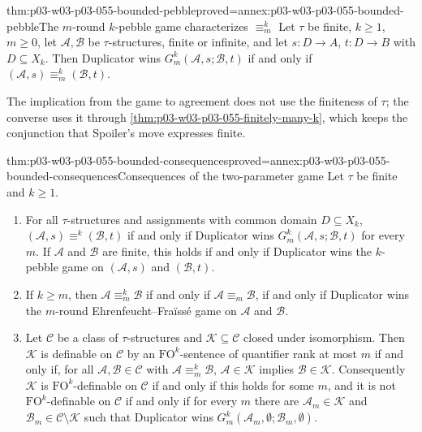 \begin{hbtheorem}{thm:p03-w03-p03-055-bounded-pebble}{proved=annex:p03-w03-p03-055-bounded-pebble}{The \(m\)-round \(k\)-pebble game characterizes \(\equiv^k_m\)}
Let \(\tau\) be finite, \(k\ge1\), \(m\ge0\), let \(\mathcal A,\mathcal B\)
be \(\tau\)-structures, finite or infinite, and let \(s\colon D\to A\),
\(t\colon D\to B\) with \(D\subseteq X_k\). Then Duplicator wins
\(G^k_m(\mathcal A,s;\mathcal B,t)\) if and only if
\((\mathcal A,s)\equiv^k_m(\mathcal B,t)\).
\end{hbtheorem}

The implication from the game to agreement does not use the finiteness of
\(\tau\); the converse uses it through
\cref{thm:p03-w03-p03-055-finitely-many-k}, which keeps the conjunction that
Spoiler's move expresses finite.

\begin{hbcorollary}{thm:p03-w03-p03-055-bounded-consequences}{proved=annex:p03-w03-p03-055-bounded-consequences}{Consequences of the two-parameter game}
Let \(\tau\) be finite and \(k\ge1\).
\begin{enumerate}
\item For all \(\tau\)-structures and assignments with common domain
      \(D\subseteq X_k\), \((\mathcal A,s)\equiv^k(\mathcal B,t)\) if and
      only if Duplicator wins \(G^k_m(\mathcal A,s;\mathcal B,t)\) for every
      \(m\). If \(\mathcal A\) and \(\mathcal B\) are finite, this holds if
      and only if Duplicator wins the \(k\)-pebble game on
      \((\mathcal A,s)\) and \((\mathcal B,t)\).
\item If \(k\ge m\), then \(\mathcal A\equiv^k_m\mathcal B\) if and only if
      \(\mathcal A\equiv_m\mathcal B\), if and only if Duplicator wins the
      \(m\)-round Ehrenfeucht--Fra\"iss\'e game on \(\mathcal A\) and
      \(\mathcal B\).
\item Let \(\mathcal C\) be a class of \(\tau\)-structures and
      \(\mathcal K\subseteq\mathcal C\) closed under isomorphism. Then
      \(\mathcal K\) is definable on \(\mathcal C\) by an
      \(\mathrm{FO}^k\)-sentence of quantifier rank at most \(m\) if and only
      if, for all \(\mathcal A,\mathcal B\in\mathcal C\) with
      \(\mathcal A\equiv^k_m\mathcal B\), \(\mathcal A\in\mathcal K\)
      implies \(\mathcal B\in\mathcal K\). Consequently \(\mathcal K\) is
      \(\mathrm{FO}^k\)-definable on \(\mathcal C\) if and only if this
      holds for some \(m\), and it is not \(\mathrm{FO}^k\)-definable on
      \(\mathcal C\) if and only if for every \(m\) there are
      \(\mathcal A_m\in\mathcal K\) and
      \(\mathcal B_m\in\mathcal C\setminus\mathcal K\) such that Duplicator
      wins \(G^k_m(\mathcal A_m,\emptyset;\mathcal B_m,\emptyset)\).
\end{enumerate}
\end{hbcorollary}

